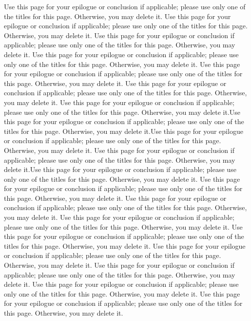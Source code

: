 \begin{flushleft}
Use this page for your epilogue or conclusion if applicable; please use only one of the titles for this page. Otherwise, you may delete it.
Use this page for your epilogue or conclusion if applicable; please use only one of the titles for this page. Otherwise, you may delete it.
Use this page for your epilogue or conclusion if applicable; please use only one of the titles for this page. Otherwise, you may delete it.
Use this page for your epilogue or conclusion if applicable; please use only one of the titles for this page. Otherwise, you may delete it.
Use this page for your epilogue or conclusion if applicable; please use only one of the titles for this page. Otherwise, you may delete it.
Use this page for your epilogue or conclusion if applicable; please use only one of the titles for this page. Otherwise, you may delete it.
Use this page for your epilogue or conclusion if applicable; please use only one of the titles for this page. Otherwise, you may delete it.Use this page for your epilogue or conclusion if applicable; please use only one of the titles for this page. Otherwise, you may delete it.Use this page for your epilogue or conclusion if applicable; please use only one of the titles for this page. Otherwise, you may delete it.
Use this page for your epilogue or conclusion if applicable; please use only one of the titles for this page. Otherwise, you may delete it.Use this page for your epilogue or conclusion if applicable; please use only one of the titles for this page. Otherwise, you may delete it.
Use this page for your epilogue or conclusion if applicable; please use only one of the titles for this page. Otherwise, you may delete it.
Use this page for your epilogue or conclusion if applicable; please use only one of the titles for this page. Otherwise, you may delete it.
Use this page for your epilogue or conclusion if applicable; please use only one of the titles for this page. Otherwise, you may delete it.
Use this page for your epilogue or conclusion if applicable; please use only one of the titles for this page. Otherwise, you may delete it.
Use this page for your epilogue or conclusion if applicable; please use only one of the titles for this page. Otherwise, you may delete it.
Use this page for your epilogue or conclusion if applicable; please use only one of the titles for this page. Otherwise, you may delete it.
Use this page for your epilogue or conclusion if applicable; please use only one of the titles for this page. Otherwise, you may delete it.
Use this page for your epilogue or conclusion if applicable; please use only one of the titles for this page. Otherwise, you may delete it.

\end{flushleft}
